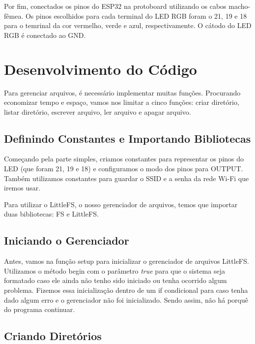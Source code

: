 \documentclass[12pt]{article}
\begin{document}
Por fim, conectados os pinos do ESP32 na protoboard utilizando os cabos macho-fêmea. Os pinos escolhidos para cada terminal do LED RGB foram o 21, 19 e 18 para o temrinal da cor vermelho, verde e azul, respectivamente. O cátodo do LED RGB é conectado ao GND.

\section{Desenvolvimento do Código}

Para gerenciar arquivos, é necessário implementar muitas funções. Procurando economizar tempo e espaço, vamos nos limitar a cinco funções: criar diretório, listar diretório, escrever arquivo, ler arquivo e apagar arquivo.

\subsection{Definindo Constantes e Importando Bibliotecas}

Começando pela parte simples, criamos constantes para representar os pinos do LED (que foram 21, 19 e 18) e configuramos o modo dos pinos para OUTPUT. Também utilizamos constantes para guardar o SSID e a senha da rede Wi-Fi que iremos usar.

Para utilizar o LittleFS, o nosso gerenciador de arquivos, temos que importar duas bibliotecas: FS e LittleFS.

 

\subsection{Iniciando o Gerenciador}

Antes, vamos na função setup para inicializar o gerenciador de arquivos LittleFS. Utilizamos o método begin com o parâmetro \textit{true} para que o sistema seja formatado caso ele ainda não tenho sido iniciado ou tenha ocorrido algum problema. Fizemos essa inicialização dentro de um if condicional para caso tenha dado algum erro e o gerenciador não foi inicializado. Sendo assim, não há porquê do programa continuar.



\subsection{Criando Diretórios}
\end{document}
